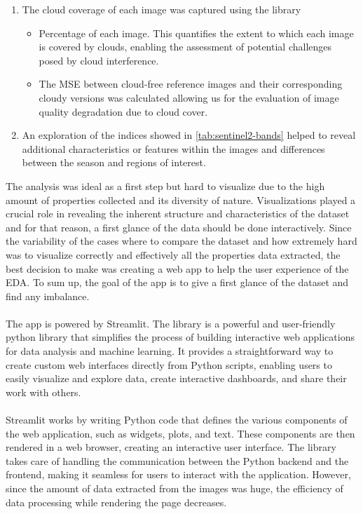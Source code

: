 \begin{enumerate}
\begin{itemize}
	\end{itemize}
	\item  The cloud coverage of each image was captured using the library  
	\begin{itemize}
		\item Percentage of each image. This quantifies the extent to which each image is covered by clouds, enabling the assessment of potential challenges posed by cloud interference.
		\item The MSE between cloud-free reference images and their corresponding cloudy versions was calculated allowing us for the evaluation of image quality degradation due to cloud cover.
	\end{itemize}
	\item An exploration of the indices showed in \ref{tab:sentinel2-bands} helped to reveal additional characteristics or features within the images and differences between the season and regions of interest.
\end{enumerate}
The analysis was ideal as a first step but hard to visualize due to the high amount of properties collected and its diversity of nature. Visualizations played a crucial role in revealing the inherent structure and characteristics of the dataset and for that reason, a first glance of the data should be done interactively. 
Since the variability of the cases where to compare the dataset and how extremely hard was to visualize correctly and effectively all the properties data extracted, the best decision to make was creating a web app to help the user experience of the EDA. To sum up, the goal of the app is to give a first glance of the dataset and find any imbalance. 
\\
\\
The app is powered by Streamlit. The library is a powerful and user-friendly python library that simplifies the process of building interactive web applications for data analysis and machine learning. It provides a straightforward way to create custom web interfaces directly from Python scripts, enabling users to easily visualize and explore data, create interactive dashboards, and share their work with others.
\\\\
Streamlit works by writing Python code that defines the various components of the web application, such as widgets, plots, and text. These components are then rendered in a web browser, creating an interactive user interface. The library takes care of handling the communication between the Python backend and the frontend, making it seamless for users to interact with the application. However, since the amount of data extracted from the images was huge, the efficiency of data processing while rendering the page decreases.
